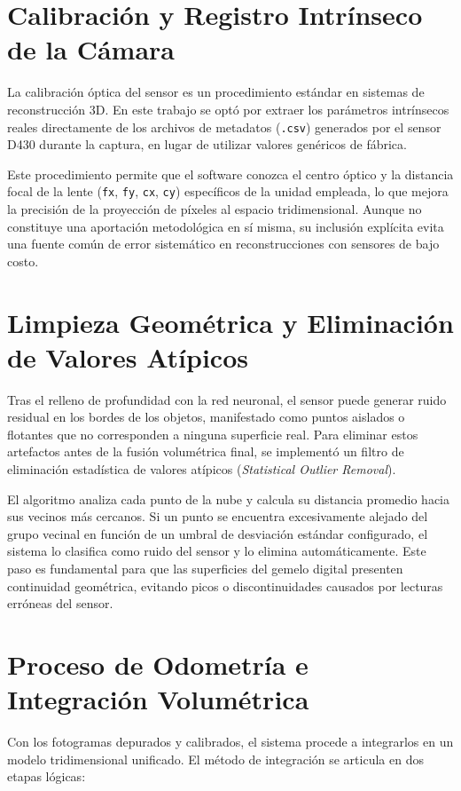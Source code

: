 \documentclass[12pt, a4, twoside, openany]{report}
\begin{document}
\section{Calibración y Registro Intrínseco de la Cámara}

La calibración óptica del sensor es un procedimiento estándar en sistemas de reconstrucción 3D. En este trabajo se optó por extraer los parámetros intrínsecos reales directamente de los archivos de metadatos (\texttt{.csv}) generados por el sensor D430 durante la captura, en lugar de utilizar valores genéricos de fábrica.

Este procedimiento permite que el software conozca el centro óptico y la distancia focal de la lente (\texttt{fx}, \texttt{fy}, \texttt{cx}, \texttt{cy}) específicos de la unidad empleada, lo que mejora la precisión de la proyección de píxeles al espacio tridimensional. Aunque no constituye una aportación metodológica en sí misma, su inclusión explícita evita una fuente común de error sistemático en reconstrucciones con sensores de bajo costo.

\section{Limpieza Geométrica y Eliminación de Valores Atípicos}

Tras el relleno de profundidad con la red neuronal, el sensor puede generar ruido residual en los bordes de los objetos, manifestado como puntos aislados o flotantes que no corresponden a ninguna superficie real. Para eliminar estos artefactos antes de la fusión volumétrica final, se implementó un filtro de eliminación estadística de valores atípicos (\textit{Statistical Outlier Removal}).

El algoritmo analiza cada punto de la nube y calcula su distancia promedio hacia sus vecinos más cercanos. Si un punto se encuentra excesivamente alejado del grupo vecinal en función de un umbral de desviación estándar configurado, el sistema lo clasifica como ruido del sensor y lo elimina automáticamente. Este paso es fundamental para que las superficies del gemelo digital presenten continuidad geométrica, evitando picos o discontinuidades causados por lecturas erróneas del sensor.

\section{Proceso de Odometría e Integración Volumétrica}

Con los fotogramas depurados y calibrados, el sistema procede a integrarlos en un modelo tridimensional unificado. El método de integración se articula en dos etapas lógicas:
\end{document}
